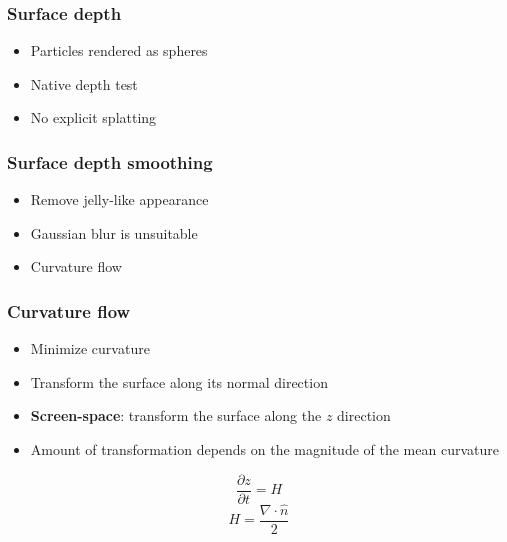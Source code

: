 \documentclass{beamer}
\begin{document}
	\begin{frame}[t]\frametitle{Surface depth}
		\begin{itemize}
			\item Particles rendered as spheres
			\item Native depth test
			\item No explicit splatting
		\end{itemize}	
	\end{frame}
	\begin{frame}[t]\frametitle{Surface depth smoothing}
	    \begin{itemize}
	    	\item Remove jelly-like appearance
	    	\item Gaussian blur is unsuitable
	    	\item Curvature flow
	    \end{itemize}
	\end{frame}
	\begin{frame}[t]\frametitle{Curvature flow}
		\begin{itemize}
			\item Minimize curvature
			\item Transform the surface along its normal direction 
			\item \textbf{Screen-space}: transform the surface along the $z$ direction 
			\item Amount of transformation depends on the magnitude of the mean curvature
		\end{itemize}
		\begin{equation}
			\frac{\partial z}{\partial t} = H
		\end{equation}
		\begin{equation}
			H = \frac{\nabla \cdot \hat{n}}{2}
		\end{equation}
	\end{frame}
\end{document}
